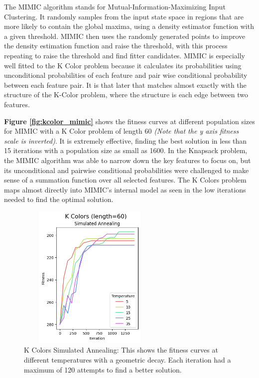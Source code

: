 \documentclass[letterpaper]{article} %
\begin{document}
The MIMIC algorithm stands for Mutual-Information-Maximizing Input Clustering.  It randomly samples from the input state space in regions that are more likely to contain the global maxima, using a density estimator function with a given threshold.  MIMIC then uses the randomly generated points to improve the density estimation function and raise the threshold, with this process repeating to raise the threshold and find fitter candidates.  MIMIC is especially well fitted to the K Color problem because  it calculates its probabilities using unconditional probabilities of each feature and pair wise conditional probability between each feature pair.  It is that later that matches almost exactly with the structure of the K-Color problem, where the structure is each edge between two features.  

\textbf{Figure \ref{fig:kcolor_mimic}} shows the fitness curves at different population sizes for MIMIC with a K Color problem of length 60  \emph{(Note that the y axis fitness scale is inverted)}.  It is extremely effective, finding the best solution in less than 15 iterations with a population size as small as 1600.  In the Knapsack problem, the MIMIC algorithm was able to narrow down the key features to focus on, but its unconditional and pairwise conditional probabilities were challenged to make sense of a summation function over all selected features. The K Colors problem maps almost directly into MIMIC's internal model as seen in the low iterations needed to find the optimal solution. 

\begin{figure}[!htb]
\centering
\includegraphics[width=2.75in, height=2.75in]{figures/K_Colors_length=60_Simulated_Annealing_l_60_ma_300_d_geom_t_5__10__15__25__35_.png}
\caption{K Colors Simulated Annealing: This shows the fitness curves at different temperatures with a geometric decay. Each iteration had a maximum of 120 attempts to find a better solution. }
\label{fig:kcolor_sa}
\end{figure}
\end{document}
